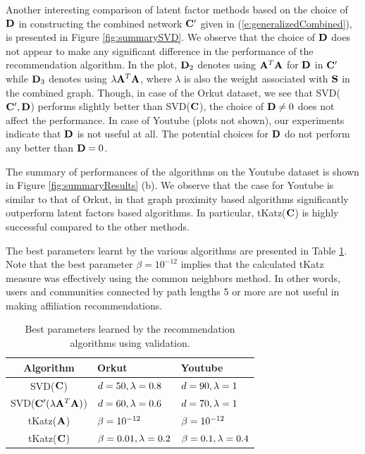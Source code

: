 \documentclass{sig-alternate}
\begin{document}
Another interesting comparison of latent factor methods based on the choice of $\mathbf{D}$ in constructing the combined network $\mathbf{C}'$ given in (\ref{e:generalizedCombined}), is presented in Figure \ref{fig:summarySVD}. We observe that the choice of $\mathbf{D}$ does not appear to make any significant difference in the performance of the recommendation algorithm. In the plot, $\mathbf{D}_2$ denotes using $\mathbf{A}^{T}\mathbf{A}$ for $\mathbf{D}$ in $\mathbf{C}'$  while $\mathbf{D}_3$ denotes using $\lambda \mathbf{A}^{T}\mathbf{A}$, where $\lambda$ is also the weight associated with $\mathbf{S}$ in the combined graph. Though, in case of the Orkut dataset, we see that SVD($\mathbf{C}', \mathbf{D}$) performs slightly better than SVD($\mathbf{C}$), the choice of $\mathbf{D} \neq 0$ does not affect the performance. In case of Youtube (plots not shown), our experiments indicate that $\mathbf{D}$ is not useful at all. The potential choices for $\mathbf{D}$ do not perform any better than $\mathbf{D} = 0$.

The summary of performances of the algorithms on the Youtube dataset is shown in Figure \ref{fig:summaryResults} (b). We observe that the case for Youtube is similar to that of Orkut, in that graph proximity based algorithms significantly outperform latent factors based algorithms. In particular, tKatz($\mathbf{C}$) is highly successful compared to the other methods. 

The best parameters learnt by the various algorithms are presented in Table \ref{tab:parameters}. Note that the best parameter $\beta = 10^{-12}$ implies that the calculated tKatz measure was effectively using the common neighbors method. In other words, users and communities connected by path lengths 5 or more are not useful in making affiliation recommendations.

\begin{table}[h!]
\centering
\begin{tabular}{| c | p{2.4cm} | p{2.4cm} |} \hline
Algorithm&Orkut&Youtube\\ \hline
SVD($\mathbf{C}$) & $d=50, \lambda = 0.8$ & $d = 90, \lambda = 1$ \\ \hline
SVD($\mathbf{C}'(\lambda \mathbf{A}^{T} \mathbf{A})$) & $d = 60, \lambda = 0.6$ & $d = 70, \lambda = 1$ \\ \hline
tKatz($\mathbf{A}$) & $\beta = 10^{-12}$ & $\beta = 10^{-12}$ \\ \hline
tKatz($\mathbf{C}$) & $\beta = 0.01, \lambda = 0.2$ & $\beta = 0.1, \lambda = 0.4$ \\ \hline
\end{tabular}
\caption{Best parameters learned by the recommendation algorithms using validation.}
\label{tab:parameters}
\end{table}
\end{document}
